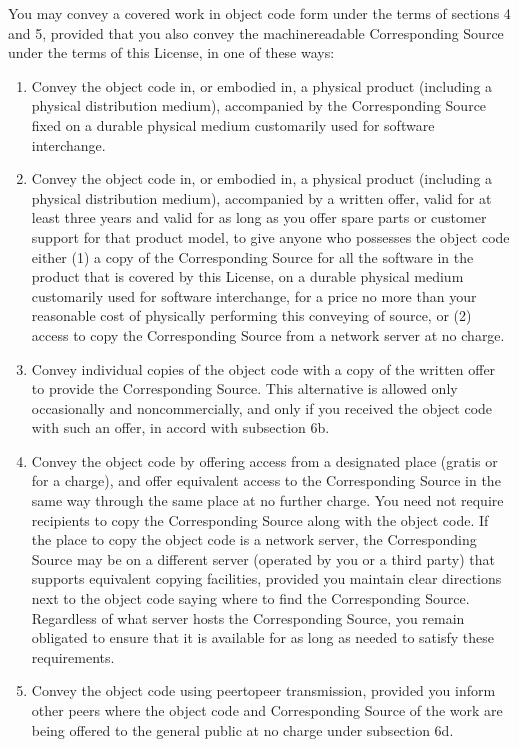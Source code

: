 \documentclass[letterpaper,10pt,english]{sphinxmanual}
\begin{document}
\sphinxAtStartPar
You may convey a covered work in object code form under the terms of sections 4 and 5, provided that you also convey the machine\sphinxhyphen{}readable Corresponding Source under the terms of this License, in one of these ways:
\begin{enumerate}
%
\item {} 
\sphinxAtStartPar
Convey the object code in, or embodied in, a physical product (including a physical distribution medium), accompanied by the Corresponding Source fixed on a durable physical medium customarily used for software interchange.

\item {} 
\sphinxAtStartPar
Convey the object code in, or embodied in, a physical product (including a physical distribution medium), accompanied by a written offer, valid for at least three years and valid for as long as you offer spare parts or customer support for that product model, to give anyone who possesses the object code either (1) a copy of the Corresponding Source for all the software in the product that is covered by this License, on a durable physical medium customarily used for software interchange, for a price no more than your reasonable cost of physically performing this conveying of source, or (2) access to copy the Corresponding Source from a network server at no charge.

\item {} 
\sphinxAtStartPar
Convey individual copies of the object code with a copy of the written offer to provide the Corresponding Source. This alternative is allowed only occasionally and noncommercially, and only if you received the object code with such an offer, in accord with subsection 6b.

\item {} 
\sphinxAtStartPar
Convey the object code by offering access from a designated place (gratis or for a charge), and offer equivalent access to the Corresponding Source in the same way through the same place at no further charge. You need not require recipients to copy the Corresponding Source along with the object code. If the place to copy the object code is a network server, the Corresponding Source may be on a different server (operated by you or a third party) that supports equivalent copying facilities, provided you maintain clear directions next to the object code saying where to find the Corresponding Source. Regardless of what server hosts the Corresponding Source, you remain obligated to ensure that it is available for as long as needed to satisfy these requirements.

\item {} 
\sphinxAtStartPar
Convey the object code using peer\sphinxhyphen{}to\sphinxhyphen{}peer transmission, provided you inform other peers where the object code and Corresponding Source of the work are being offered to the general public at no charge under subsection 6d.

\end{enumerate}
\end{document}
